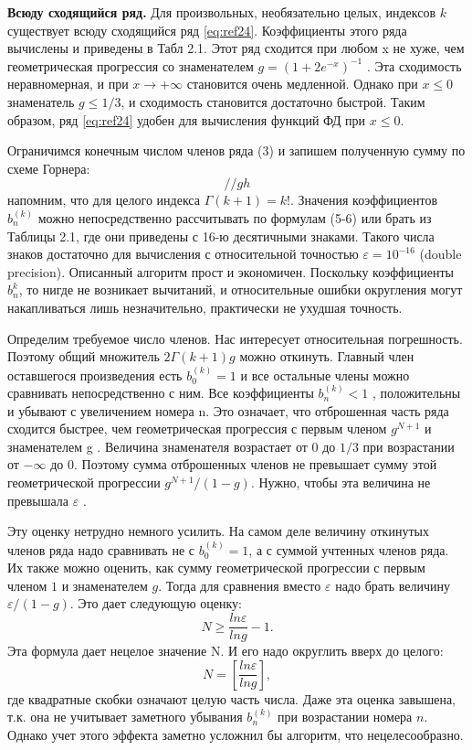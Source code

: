 \textbf{Всюду сходящийся ряд.} Для произвольных, необязательно целых,
индексов $k$ существует всюду сходящийся ряд \ref{eq:ref24}.
Коэффициенты этого ряда вычислены и приведены в Табл 2.1.
Этот ряд сходится при любом x не хуже, чем геометрическая прогрессия со
знаменателем $g = (1 + 2e^{-x})^{-1}$ . Эта сходимость неравномерная, и при $x \to +\infty$
становится очень медленной. Однако при $x \leqslant 0$ знаменатель $g \leqslant 1/3$, и
сходимость становится достаточно быстрой. Таким образом, ряд \ref{eq:ref24} удобен для
вычисления функций ФД при $x \leqslant 0$.

Ограничимся конечным числом членов ряда (3) и запишем
полученную сумму по схеме Горнера:
\begin{equation}
// gh
\end{equation}
напомним, что для целого индекса $\Gamma(k+1) = k!$. Значения коэффициентов $b_n^{(k)}$
можно непосредственно рассчитывать по формулам (5-6) или брать из Таблицы 2.1, где
они приведены с 16-ю десятичными знаками. Такого числа знаков достаточно
для вычисления с относительной точностью $\varepsilon = 10^{-16}$ (double precision).
Описанный алгоритм прост и экономичен. Поскольку коэффициенты $b_n^{k}$, то нигде не возникает вычитаний, и относительные ошибки округления могут накапливаться лишь незначительно, практически не ухудшая точность.

Определим требуемое число членов. Нас интересует относительная погрешность. Поэтому
общий множитель $2\Gamma(k + 1)g$ можно откинуть. Главный член оставшегося
произведения есть $b_0^{(k)}=1$ и все остальные члены можно сравнивать
непосредственно с ним. Все коэффициенты $b_n^{(k)}<1$ , положительны и убывают с
увеличением номера n. Это означает, что отброшенная часть ряда сходится
быстрее, чем геометрическая прогрессия с первым членом $g^{N+1}$ и знаменателем
g . Величина знаменателя возрастает от $0$ до $1/3$ при возрастании от $-\infty$ до 0.
Поэтому сумма отброшенных членов не превышает сумму этой геометрической
прогрессии $g^{N+1}/(1-g)$. Нужно, чтобы эта величина не превышала $\varepsilon$ .

Эту оценку нетрудно немного усилить. На самом деле величину откинутых
членов ряда надо сравнивать не с $b_0^{(k)}=1$, а с суммой учтенных членов ряда. Их
также можно оценить, как сумму геометрической прогрессии с первым членом
$1$ и знаменателем $g$. Тогда для сравнения вместо $\varepsilon$ надо брать величину
$\varepsilon/(1-g)$. Это дает следующую оценку:
\begin{equation}
N \geqslant \frac{ln \varepsilon}{ln g} - 1.
\end{equation}
Эта формула дает нецелое значение N. И его надо округлить вверх до целого:
\begin{equation}
N = [\frac{ln \varepsilon}{ln g}],
\end{equation}
где квадратные скобки означают целую часть числа. Даже эта оценка завышена,
т.к. она не учитывает заметного убывания $b_n^{(k)}$ при возрастании номера $n$.
Однако учет этого эффекта заметно усложнил бы алгоритм, что
нецелесообразно.

